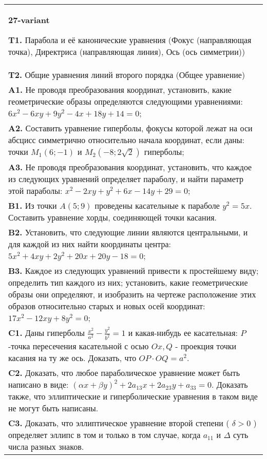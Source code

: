 \documentclass{article}
\begin{document}
\begin{tabular}{m{17cm}}
\textbf{27-variant}
\newline

\textbf{T1.} Парабола и её канонические уравнения (Фокус (направляющая точка), Директриса (направляющая линия), Ось (ось симметрии)) \\
\textbf{T2.} Общие уравнения линий второго порядка (Общее уравнение) \\
\textbf{A1.} Не проводя преобразования координат, установить, какие геометрические образы определяются следующими уравнениями: $6 x^2-6 x y+9 y^2-4 x+18 y+14=0$; \\
\textbf{A2.} Составить уравнение гиперболы, фокусы которой лежат на оси абсцисс симметрично относительно начала координат, если даны: точки $M_1(6 ;-1)$ и $M_2(-8 ; 2 \sqrt{2})$ гиперболы; \\
\textbf{A3.} Не проводя преобразования координат, установить, что каждое из следующих уравнений определяет параболу, и найти параметр этой параболы: $x^2-2 x y+y^2+6 x-14 y+29=0$; \\
\textbf{B1.} Из точки $A(5 ; 9)$ проведены касательные к параболе $y^2=5 x$. Составить уравнение хорды, соединяющей точки касания. \\
\textbf{B2.} Установить, что следующие линии являются центральными, и для каждой из них найти координаты центра: $5 x^2+4 x y+2 y^2+20 x+20 y-18=0$; \\
\textbf{B3.} Каждое из следующих уравнений привести к простейшему виду; определить тип каждого из них; установить, какие геометрические образы они определяют, и изобразить на чертеже расположение этих образов относительно старых и новых осей координат: $17 x^2-12 x y+8 y^2=0$; \\
\textbf{C1.} Даны гиперболы $\frac{x^2}{a^2}-\frac{y^2}{b^2}=1$ и какая-нибудь ее касательная: $P$-точка пересечения касательной с осью $O x, Q$ - проекция точки касания на ту же ось. Доказать, что $O P \cdot O Q=a^2$. \\
\textbf{C2.} Доказать, что любое параболическое уравнение может быть написано в виде: $ (\alpha x+\beta y) ^2+2a_{13}x+2a_{23}y+a_{33}=0$. Доказать также, что эллиптические и гиперболические уравнения в таком виде не могут быть написаны. \\
\textbf{C3.} Доказать, что эллиптическое уравнение второй степени ( $\delta>0$ ) определяет эллипс в том и только в том случае, когда $a_{11}$ и $\Delta$ суть числа разных знаков. \\

\end{tabular}
\vspace{1cm}
\end{document}
